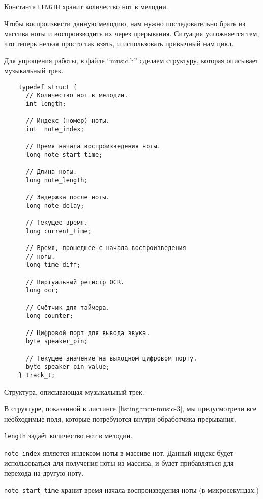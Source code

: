 \documentclass[../sparc.tex]{subfiles}
\begin{document}
Константа \texttt{LENGTH} хранит количество нот в мелодии.

Чтобы воспроизвести данную мелодию, нам нужно последовательно брать из массива
ноты и воспроизводить их через прерывания.  Ситуация усложняется тем, что теперь
нельзя просто так взять, и использовать привычный нам цикл.

Для упрощения работы, в файле ``music.h'' сделаем структуру, которая описывает
музыкальный трек.

\begin{listing}[H]
  \begin{verbatim}
    typedef struct {
      // Количество нот в мелодии.
      int length;

      // Индекс (номер) ноты.
      int  note_index;

      // Время начала воспроизведения ноты.
      long note_start_time;

      // Длина ноты.
      long note_length;

      // Задержка после ноты.
      long note_delay;

      // Текущее время.
      long current_time;

      // Время, прошедшее с начала воспроизведения
      // ноты.
      long time_diff;

      // Виртуальный регистр OCR.
      long ocr;

      // Счётчик для таймера.
      long counter;

      // Цифровой порт для вывода звука.
      byte speaker_pin;

      // Текущее значение на выходном цифровом порту.
      byte speaker_pin_value;
    } track_t;
  \end{verbatim}
  \caption{Структура, описывающая музыкальный трек.}
  \label{listing:mcu-music-3}
\end{listing}

В структуре, показанной в листинге \ref{listing:mcu-music-3}, мы предусмотрели
все необходимые поля, которые потребуются внутри обработчика прерывания.

\texttt{length} задаёт количество нот в мелодии.

\texttt{note_index} является индексом ноты в массиве нот.  Данный
индекс будет использоваться для получения ноты из массива, и будет прибавляться
для перехода на другую ноту.

\texttt{note_start_time} хранит время начала воспроизведения ноты (в
микросекундах.)
\end{document}
